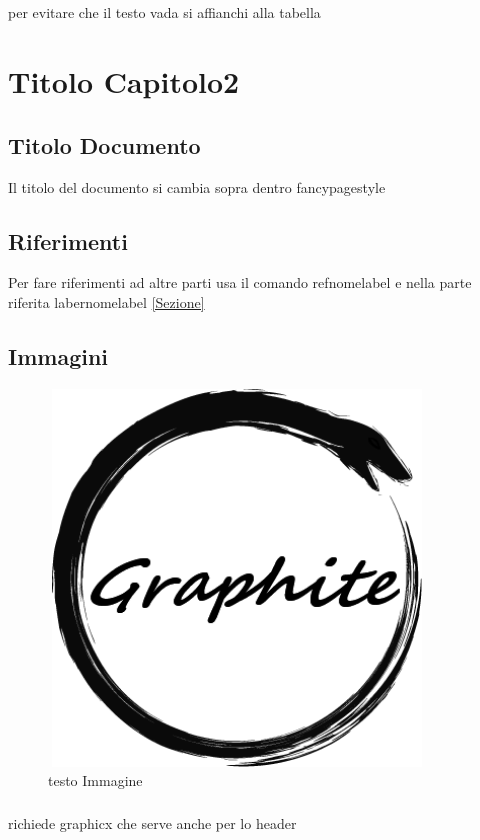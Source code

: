\documentclass[openany,12pt,a4paper]{report}
\begin{document}
\paragraph{}per evitare che il testo vada si affianchi alla tabella


\chapter{Titolo Capitolo2}


\section{Titolo Documento}
Il titolo del documento si cambia sopra dentro fancypagestyle
\section{Riferimenti}
Per fare riferimenti ad altre parti usa il comando ref{nomelabel} e nella parte riferita laber{nomelabel}
\ref{Sezione} 
\section{Immagini}
\begin{figure}[!ht]
	\centering
	\includegraphics[width=10cm,height=10cm]{Logos.png}
	\caption{testo Immagine}
\end{figure}

\paragraph{}
richiede graphicx che serve anche per lo header
\end{document}
